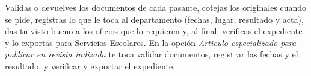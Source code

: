 \documentclass[11pt,a4paper]{article}
\begin{document}
{\small\tableofcontents}
\newpage
\begin{quevasahacer}
Validas o devuelves los documentos de cada pasante, cotejas los originales cuando se pide, registras lo que le toca al departamento (fechas, lugar, resultado y acta), das tu visto bueno a los oficios que lo requieren y, al final, verificas el expediente y lo exportas para Servicios Escolares. En la opción \emph{Artículo especializado para publicar en revista indizada} te toca validar documentos, registrar las fechas y el resultado, y verificar y exportar el expediente.
\end{quevasahacer}



\end{document}
